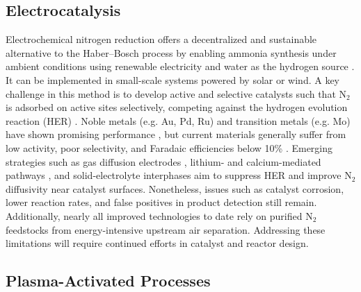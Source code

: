 \subsection{Electrocatalysis}
Electrochemical nitrogen reduction offers a decentralized and sustainable alternative to the Haber–Bosch process by enabling ammonia synthesis under ambient conditions using renewable electricity and water as the hydrogen source \cite{Greenlee2018TheDinitrogen, Foster2018CatalystsAmmonia}. It can be implemented in small-scale systems powered by solar or wind. A key challenge in this method is to develop active and selective catalysts such that N$_2$ is adsorbed on active sites selectively, competing against the hydrogen evolution reaction (HER) \cite{Singh_2017}. Noble metals (e.g. Au, Pd, Ru) and transition metals (e.g. Mo) have shown promising performance \cite{Wang2018AmbientOverpotential, Bao2017ElectrochemicalCycle, Cheng2018MolybdenumConditions}, but current materials generally suffer from low activity, poor selectivity, and Faradaic efficiencies below 10\% \cite{R.Singh2016ElectrochemicalChallenge, Giddey2013ReviewMaterials, Guo2018RationalConditions, Cui2018AConditions, Kyriakou2017ProgressAmmonia}. Emerging strategies such as gas diffusion electrodes \cite{Fu2023Continuous-flowOxidation}, lithium- and calcium-mediated pathways \cite{McEnaney2017AmmoniaPressure, Li2021EnhancementOxygen, Suryanto2021NitrogenShuttle, Cai2021Lithium-mediatedPerformance, Fu2024Calcium-mediatedSynthesis},  and solid-electrolyte interphases \cite{Li2022ElectrosynthesisInterphase} aim to suppress HER and improve N$_2$ diffusivity near catalyst surfaces. Nonetheless, issues such as catalyst corrosion, lower reaction rates, and false positives in product detection still remain. Additionally, nearly all improved technologies to date rely on purified N$_2$ feedstocks from energy-intensive upstream air separation. Addressing these limitations will require continued efforts in catalyst and reactor design.


\subsection{Plasma-Activated Processes}

